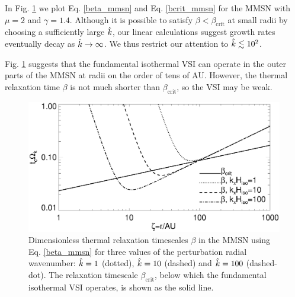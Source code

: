 In Fig. \ref{mmsn_bcrit_bcool} we plot Eq. \ref{beta_mmsn} and
Eq. \ref{bcrit_mmsn} for the MMSN with $\mu = 2$ and
$\gamma=1.4$. Although it is possible to satisfy
$\beta<\beta_\mathrm{crit}$ at small radii by choosing a sufficiently
large $\hat{k}$, our linear calculations suggest growth rates eventually
decay as $\hat{k}\to\infty$. We thus restrict our attention to
$\hat{k}\lesssim 10^2$. 

Fig. \ref{mmsn_bcrit_bcool} suggests that the fundamental isothermal
VSI can operate in the outer parts of the MMSN at radii on the order
of tens of AU. However, the thermal relaxation time $\beta$ is not
much shorter than $\beta_\mathrm{crit}$, so the VSI may be
weak.   

\begin{figure}
  \includegraphics[width=\linewidth]{figures/bcrit_mmsn}  
  \caption{Dimensionless thermal relaxation timescales $\beta$ in the MMSN
    using Eq. \ref{beta_mmsn} for three values of the 
    perturbation radial wavenumber: $\hat{k}=1$ (dotted), $\hat{k}=10$
    (dashed) and $\hat{k}=100$ (dashed-dot). The relaxation timescale
    $\beta_\mathrm{crit}$, below which the fundamental isothermal VSI
    operates, is shown as the solid line. 
    \label{mmsn_bcrit_bcool}}   
\end{figure}  

